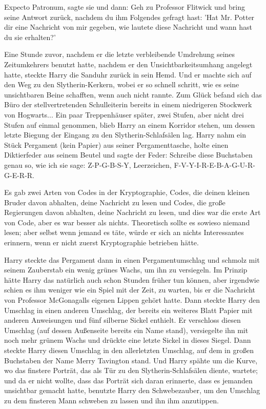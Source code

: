 \glqq{}Expecto Patronum\grqq{}, sagte sie und dann: \glqq{}Geh zu Professor
Flitwick und bring seine Antwort zurück, nachdem du ihm Folgendes gefragt hast:
'Hat Mr. Potter dir eine Nachricht von mir gegeben, wie lautete diese Nachricht
und wann hast du sie erhalten?'\grqq{}

Eine Stunde zuvor, nachdem er die letzte verbleibende Umdrehung seines
Zeitumkehrers benutzt hatte, nachdem er den Unsichtbarkeitsumhang angelegt
hatte, steckte Harry die Sanduhr zurück in sein Hemd. Und er machte sich auf den
Weg zu den Slytherin-Kerkern, wobei er so schnell schritt, wie es seine
unsichtbaren Beine schafften, wenn auch nicht rannte. Zum Glück befand sich das
Büro der stellvertretenden Schulleiterin bereits in einem niedrigeren Stockwerk
von Hogwarts... Ein paar Treppenhäuser später, zwei Stufen, aber nicht drei
Stufen auf einmal genommen, blieb Harry an einem Korridor stehen, um dessen
letzte Biegung der Eingang zu den Slytherin-Schlafsälen lag. Harry nahm ein
Stück Pergament (kein Papier) aus seiner Pergamenttasche, holte einen
Diktierfeder aus seinem Beutel und sagte der Feder: \glqq{}Schreibe diese
Buchstaben genau so, wie ich sie sage: Z-P-G-B-S-Y, Leerzeichen,
F-V-Y-I-R-E-B-A-G-U-R-G-E-R-R.\grqq{}

Es gab zwei Arten von Codes in der Kryptographie, Codes, die deinen kleinen
Bruder davon abhalten, deine Nachricht zu lesen und Codes, die große Regierungen
davon abhalten, deine Nachricht zu lesen, und dies war die erste Art von Code,
aber es war besser als nichts. Theoretisch sollte es sowieso niemand lesen; aber
selbst wenn jemand es täte, würde er sich an nichts Interessantes erinnern, wenn
er nicht zuerst Kryptographie betrieben hätte.

Harry steckte das Pergament dann in einen Pergamentumschlag und schmolz mit
seinem Zauberstab ein wenig grünes Wachs, um ihn zu versiegeln. Im Prinzip hätte
Harry das natürlich auch schon Stunden früher tun können, aber irgendwie schien
es ihm weniger wie ein Spiel mit der Zeit, zu warten, bis er die Nachricht von
Professor McGonagalls eigenen Lippen gehört hatte. Dann steckte Harry den
Umschlag in einen anderen Umschlag, der bereits ein weiteres Blatt Papier mit
anderen Anweisungen und fünf silberne Sickel enthielt. Er verschloss diesen
Umschlag (auf dessen Außenseite bereits ein Name stand), versiegelte ihn mit
noch mehr grünem Wachs und drückte eine letzte Sickel in dieses Siegel. Dann
steckte Harry diesen Umschlag in den allerletzten Umschlag, auf dem in großen
Buchstaben der Name \glqq{}Merry Tavington\grqq{} stand. Und Harry spähte um die
Kurve, wo das finstere Porträt, das als Tür zu den Slytherin-Schlafsälen diente,
wartete; und da er nicht wollte, dass das Porträt sich daran erinnerte, dass es
jemanden unsichtbar gemacht hatte, benutzte Harry den Schwebezauber, um den
Umschlag zu dem finsteren Mann schweben zu lassen und ihn ihm anzutippen.

